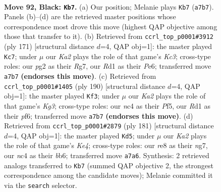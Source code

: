 \documentclass[11pt]{article}
\begin{document}
\clearpage

\begin{figure}[p]\centering
\begin{subfigure}{0.46\textwidth}\centering
\resizebox{\linewidth}{!}{%
\newchessgame
\chessboard[
  setfen={4R3/k7/8/5K2/2N5/8/6P1/3r4 b - - 49 92},
  showmover=false,
  pgfstyle=straightmove, color=movearrow, markmove={a7-b7}
]}
\caption{}
\end{subfigure}\hfill
\begin{subfigure}{0.46\textwidth}\centering
\resizebox{\linewidth}{!}{%
\newchessgame
\chessboard[
  setfen={3R4/6r1/2k1p3/8/5P2/8/2K5/8 b - - 0 86},
  showmover=false,
  pgfstyle=straightmove, color=movearrow, markmove={c6-c7}
]}
\caption{}
\end{subfigure}
\\[4pt]
\begin{subfigure}{0.46\textwidth}\centering
\resizebox{\linewidth}{!}{%
\newchessgame
\chessboard[
  setfen={8/R7/5p1k/5P2/1r6/6K1/8/8 w - - 4 96},
  showmover=false,
  pgfstyle=straightmove, color=movearrow, markmove={g3-f3}
]}
\caption{}
\end{subfigure}\hfill
\begin{subfigure}{0.46\textwidth}\centering
\resizebox{\linewidth}{!}{%
\newchessgame
\chessboard[
  setfen={8/6N1/1B6/4k1P1/2r5/6K1/8/8 b - - 12 91},
  showmover=false,
  pgfstyle=straightmove, color=movearrow, markmove={e5-d5}
]}
\caption{}
\end{subfigure}
\caption{\textbf{Move 92, Black: \texttt{Kb7}.} (a) Our position; Melanie plays \texttt{Kb7} (\texttt{a7b7}). Panels (b)--(d) are the retrieved master positions whose correspondence most drove this move (highest QAP objective among those that transfer to it). (b) Retrieved from \texttt{ccrl\_top\_p0001\#3912} (ply 171) [structural distance $d$=4, QAP obj=1]: the master played \texttt{Kc7}; under $\mu$ our \emph{Ka2} plays the role of that game's \emph{Kc3}; cross-type roles: our \emph{p}g2 as their \emph{R}g7, our \emph{R}d1 as their \emph{P}e6; transferred move \texttt{a7b7} \textbf{(endorses this move)}. (c) Retrieved from \texttt{ccrl\_top\_p0001\#1405} (ply 190) [structural distance $d$=4, QAP obj=1]: the master played \texttt{Kf3}; under $\mu$ our \emph{Ka2} plays the role of that game's \emph{Kg3}; cross-type roles: our \emph{n}c4 as their \emph{P}f5, our \emph{R}d1 as their \emph{p}f6; transferred move \texttt{a7b7} \textbf{(endorses this move)}. (d) Retrieved from \texttt{ccrl\_top\_p0001\#2879} (ply 181) [structural distance $d$=4, QAP obj=1]: the master played \texttt{Kd5}; under $\mu$ our \emph{Ka2} plays the role of that game's \emph{Ke4}; cross-type roles: our \emph{r}e8 as their \emph{n}g7, our \emph{n}c4 as their \emph{b}b6; transferred move \texttt{a7a6}. Synthesis: 2 retrieved analogs transferred to \texttt{Kb7} (summed QAP objective 2, the strongest correspondence among the candidate moves); Melanie committed it via the \texttt{search} selector.}
\label{fig:thought-m183}
\end{figure}
\end{document}

